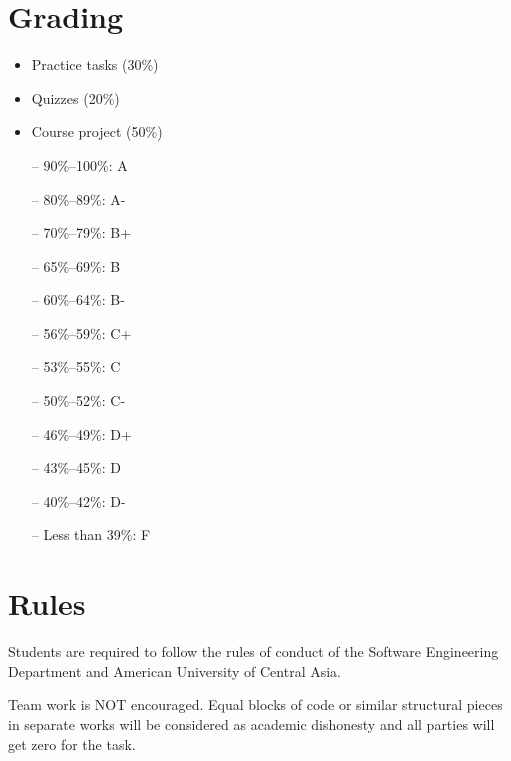 \documentclass[12pt,a4paper,oneside]{article}
\begin{document}
    \section{Grading}

        \begin{itemize}
            \item Practice tasks (30\%)
            \item Quizzes (20\%)
            \item Course project (50\%)
        \end{itemize}

        \begin{itemize} \itemsep-10pt \parskip0pt 
            \item[--] 90\%--100\%: A\\
            \item[--] 80\%--89\%: A-\\
            \item[--] 70\%--79\%: B+\\
            \item[--] 65\%--69\%: B\\
            \item[--] 60\%--64\%: B-\\
            \item[--] 56\%--59\%: C+\\
            \item[--] 53\%--55\%: C\\
            \item[--] 50\%--52\%: C-\\
            \item[--] 46\%--49\%: D+\\
            \item[--] 43\%--45\%: D\\
            \item[--] 40\%--42\%: D-\\
            \item[--] Less than 39\%: F
        \end{itemize}

    \section{Rules}

        Students are required to follow the rules of conduct of the Software
        Engineering Department and American University of Central Asia.

        Team work is NOT encouraged. Equal blocks of code or similar structural
        pieces in separate works will be considered as academic dishonesty and
        all parties will get zero for the task.
\end{document}
